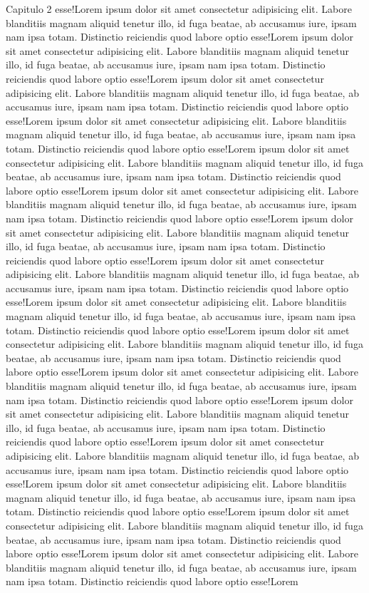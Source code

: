 \begin{capitulo}{Capitulo 2}
esse!Lorem ipsum dolor sit amet consectetur adipisicing elit. Labore blanditiis magnam aliquid tenetur illo, id fuga beatae, ab accusamus iure, ipsam nam ipsa totam. Distinctio reiciendis quod labore optio esse!Lorem ipsum dolor sit amet consectetur adipisicing elit. Labore blanditiis magnam aliquid tenetur illo, id fuga beatae, ab accusamus iure, ipsam nam ipsa totam. Distinctio reiciendis quod labore optio esse!Lorem ipsum dolor sit amet consectetur adipisicing elit. Labore blanditiis magnam aliquid tenetur illo, id fuga beatae, ab accusamus iure, ipsam nam ipsa totam. Distinctio reiciendis quod labore optio esse!Lorem ipsum dolor sit amet consectetur adipisicing elit. Labore blanditiis magnam aliquid tenetur illo, id fuga beatae, ab accusamus iure, ipsam nam ipsa totam. Distinctio reiciendis quod labore optio esse!Lorem ipsum dolor sit amet consectetur adipisicing elit. Labore blanditiis magnam aliquid tenetur illo, id fuga beatae, ab accusamus iure, ipsam nam ipsa totam. Distinctio reiciendis quod labore optio esse!Lorem ipsum dolor sit amet consectetur adipisicing elit. Labore blanditiis magnam aliquid tenetur illo, id fuga beatae, ab accusamus iure, ipsam nam ipsa totam. Distinctio reiciendis quod labore optio esse!Lorem ipsum dolor sit amet consectetur adipisicing elit. Labore blanditiis magnam aliquid tenetur illo, id fuga beatae, ab accusamus iure, ipsam nam ipsa totam. Distinctio reiciendis quod labore optio esse!Lorem ipsum dolor sit amet consectetur adipisicing elit. Labore blanditiis magnam aliquid tenetur illo, id fuga beatae, ab accusamus iure, ipsam nam ipsa totam. Distinctio reiciendis quod labore optio esse!Lorem ipsum dolor sit amet consectetur adipisicing elit. Labore blanditiis magnam aliquid tenetur illo, id fuga beatae, ab accusamus iure, ipsam nam ipsa totam. Distinctio reiciendis quod labore optio esse!Lorem ipsum dolor sit amet consectetur adipisicing elit. Labore blanditiis magnam aliquid tenetur illo, id fuga beatae, ab accusamus iure, ipsam nam ipsa totam. Distinctio reiciendis quod labore optio esse!Lorem ipsum dolor sit amet consectetur adipisicing elit. Labore blanditiis magnam aliquid tenetur illo, id fuga beatae, ab accusamus iure, ipsam nam ipsa totam. Distinctio reiciendis quod labore optio esse!Lorem ipsum dolor sit amet consectetur adipisicing elit. Labore blanditiis magnam aliquid tenetur illo, id fuga beatae, ab accusamus iure, ipsam nam ipsa totam. Distinctio reiciendis quod labore optio esse!Lorem ipsum dolor sit amet consectetur adipisicing elit. Labore blanditiis magnam aliquid tenetur illo, id fuga beatae, ab accusamus iure, ipsam nam ipsa totam. Distinctio reiciendis quod labore optio esse!Lorem ipsum dolor sit amet consectetur adipisicing elit. Labore blanditiis magnam aliquid tenetur illo, id fuga beatae, ab accusamus iure, ipsam nam ipsa totam. Distinctio reiciendis quod labore optio esse!Lorem ipsum dolor sit amet consectetur adipisicing elit. Labore blanditiis magnam aliquid tenetur illo, id fuga beatae, ab accusamus iure, ipsam nam ipsa totam. Distinctio reiciendis quod labore optio esse!Lorem ipsum dolor sit amet consectetur adipisicing elit. Labore blanditiis magnam aliquid tenetur illo, id fuga beatae, ab accusamus iure, ipsam nam ipsa totam. Distinctio reiciendis quod labore optio esse!Lorem 
\end{capitulo}
